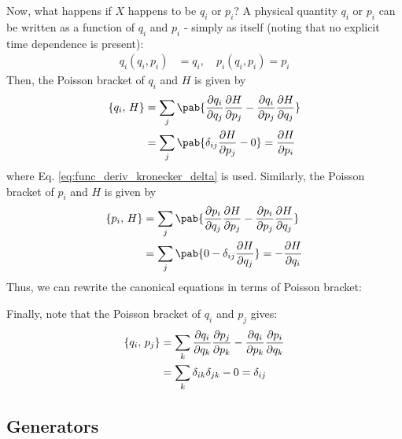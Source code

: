 Now, what happens if $X$ happens to be $q_i$ or $p_i$?
A physical quantity $q_i$ or $p_i$ can be written as a function of $q_i$ and $p_i$ - simply as itself (noting that no explicit time dependence is present):
\begin{align}
  q_i(q_i, p_i) & = q_i, \quad p_i(q_i, p_i) = p_i
\end{align}
Then, the Poisson bracket of $q_i$ and $H$ is given by
\begin{align}
  \pobra{q_i}{H} & = \sum_j \pab{\pdv{q_i}{q_j} \pdv{H}{p_j} - \pdv{q_i}{p_j} \pdv{H}{q_j}} \\
                 & = \sum_j \pab{\delta_{ij} \pdv{H}{p_j} - 0} = \pdv{H}{p_i}
\end{align}
where Eq. \eqref{eq:func_deriv_kronecker_delta} is used.
Similarly, the Poisson bracket of $p_i$ and $H$ is given by
\begin{align}
  \pobra{p_i}{H} & = \sum_j \pab{\pdv{p_i}{q_j} \pdv{H}{p_j} - \pdv{p_i}{p_j} \pdv{H}{q_j}} \\
                 & = \sum_j \pab{0 - \delta_{ij} \pdv{H}{q_j}} = - \pdv{H}{q_i}
\end{align}
Thus, we can rewrite the canonical equations in terms of Poisson bracket:

Finally, note that the Poisson bracket of $q_i$ and $p_j$ gives:
\begin{align}
  \left\lbrace q_i ,\, p_j \right\rbrace & = \sum_k \pdv{q_i}{q_k} \pdv{p_j}{p_k} - \pdv{q_i}{p_k} \pdv{p_i}{q_k} \\
                   & = \sum_k \delta_{ik} \delta_{jk} - 0 = \delta_{ij}
\end{align}

\subsection{Generators}